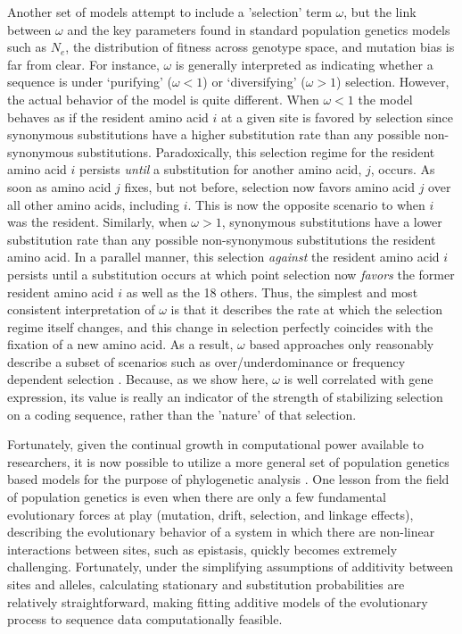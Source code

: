 \documentclass[12pt,letterpaper]{article}
\newcommand{\Ne}{\ensuremath{{N_e}}\xspace} %
\begin{document}
Another set of models attempt to include a 'selection' term $\omega$, but the link between $\omega$ and the key parameters found in standard population genetics models such as \Ne, the distribution of fitness across genotype space, and mutation bias is far from clear.
For instance, $\omega$ is generally interpreted as indicating whether a sequence is under `purifying' ($\omega < 1$) or `diversifying' ($\omega > 1$) selection.
However, the actual behavior of the model is quite different.
When $\omega < 1$ the model behaves as if the resident amino acid $i$ at a given site is favored by selection since synonymous substitutions have a higher substitution rate than any possible non-synonymous substitutions.
Paradoxically, this selection regime for the resident amino acid $i$ persists \emph{until} a substitution for another amino acid, $j$, occurs.
As soon as amino acid $j$ fixes, but not before, selection now favors amino acid $j$ over all other amino acids, including $i$.
This is now the opposite scenario to when $i$ was the resident.
Similarly, when $\omega > 1$, synonymous substitutions have a lower substitution rate than any possible non-synonymous substitutions the resident amino acid.
In a parallel manner, this selection \emph{against} the resident amino acid $i$ persists until a substitution occurs at which point selection now \emph{favors} the former resident amino acid $i$ as well as the 18 others.
Thus, the simplest and most consistent interpretation of $\omega$ is that it describes the rate at which the selection regime itself changes, and this change in selection perfectly coincides with the fixation of a new amino acid.
As a result, $\omega$ based approaches only reasonably describe a subset of scenarios such as over/underdominance or frequency dependent selection \citep{HughesAndNei1988,Nowak2006}.
Because, as we show here, $\omega$ is well correlated with gene expression, its value is really an indicator of the strength of stabilizing selection on a coding sequence, rather than the 'nature' of that selection.

Fortunately, given the continual growth in computational power available to researchers, it is now possible to utilize a more general set of population genetics based models for the purpose of phylogenetic analysis \citep[e.g.][]{HalpernAndBruno1998,RobinsonEtAl2003,LartillotAndPhilippe2004,RodrigueAndLartillot2014}.
One lesson from the field of population genetics is even when there are only a few fundamental evolutionary forces at play (mutation, drift, selection, and linkage effects), describing the evolutionary behavior of a system in which there are non-linear interactions between sites, such as epistasis, quickly becomes extremely challenging.
Fortunately, under the simplifying assumptions of additivity between sites and alleles, calculating stationary and substitution probabilities are relatively straightforward, making fitting additive models of the evolutionary process to sequence data computationally feasible.
\end{document}
